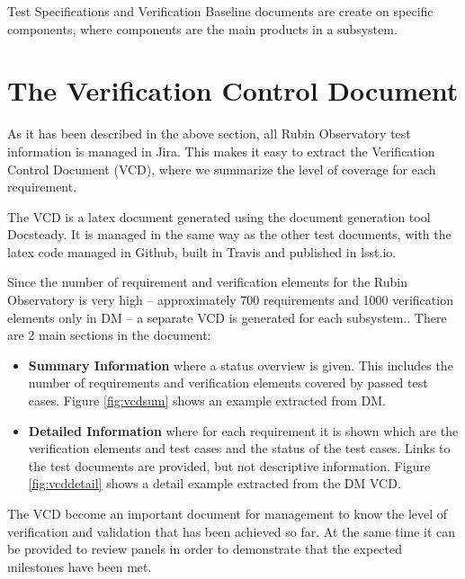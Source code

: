 Test Specifications and Verification Baseline documents are create on specific components, where components are the main products in a subsystem.


\section{The Verification Control Document}

As it has been described in the above section, all Rubin Observatory test information is managed in Jira. 
This makes it easy to extract the Verification Control Document (VCD), where we summarize the level of coverage for each requirement.

The VCD is a latex document generated using the document generation tool Docsteady. 
It is managed in the same way as the other test documents, with the latex code managed in Github,
built in Travis and published in lsst.io.

Since the number of requirement and verification elements for the Rubin Observatory is very high --
approximately 700 requirements and 1000 verification elements only in DM -- a separate VCD is generated for each subsystem..
There are 2 main sections in the document:

\begin{itemize}
\item \textbf{Summary Information} where a status overview is given. 
This includes the number of requirements and verification elements covered by passed test cases.
Figure \ref{fig:vcdsum} shows an example extracted from DM.
\item \textbf{Detailed Information} where for each requirement it is shown which are the verification elements and test cases
and the status of the test cases. Links to the test documents are provided, but not descriptive information.
Figure \ref{fig:vcddetail} shows a detail example extracted from the DM VCD.
\end{itemize}

The VCD become an important document for management to know the level of verification and validation that has been achieved so far.
At the same time it can be provided to review panels in order to demonstrate that the expected milestones have been met.

